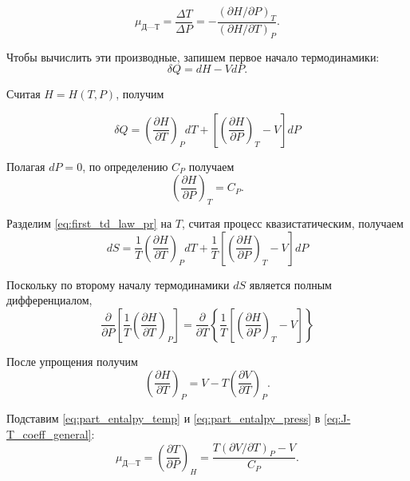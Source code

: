\documentclass[12pt]{article}
\begin{document}
	\begin{equation}
	\label{eq:J-T_coeff_general}
	\mu_\text{Д---Т}=\frac{\Delta T}{\Delta P}=-\frac{\left( \partial H/ \partial P\right)_T}{\left( \partial H/ \partial T\right)_P}.
	\end{equation}
	
	Чтобы вычислить эти производные, запишем первое начало термодинамики:
	\begin{equation}
	\label{eq:first_td_law}
	\delta Q = dH-VdP.
	\end{equation}
	
	Считая $H = H \left( T,P \right)$, получим
	
	\begin{equation}
	\label{eq:first_td_law_pr}
	\delta Q = \left( \frac{\partial H}{\partial T} \right)_P dT + \left[ \left( \frac{\partial H}{\partial P} \right)_T - V \right] dP
	\end{equation}
	
	Полагая $dP=0$, по определению $C_P$ получаем
	\begin{equation}
	\label{eq:part_entalpy_temp}
	\left( \frac{\partial H}{\partial P}\right)_T = C_P.
	\end{equation}
	
	Разделим \eqref{eq:first_td_law_pr} на $T$, считая процесс квазистатическим, получаем
	\begin{equation}
	\label{eq:enthropy_diff}
	dS = \frac{1}{T} \left( \frac{\partial H}{\partial T} \right)_P dT + \frac{1}{T} \left[ \left( \frac{\partial H}{\partial P} \right)_T - V \right] dP
	\end{equation}
	
	Поскольку по второму началу термодинамики $dS$ является полным дифференциалом,
	\begin{equation}
	\label{eq:enthropy_sec_partials}
	\frac{\partial}{\partial P} \left[ \frac{1}{T} \left( \frac{\partial H}{\partial T} \right)_P \right] = \frac{\partial}{\partial T} \left\{ \frac{1}{T} \left[ \left( \frac{\partial H}{\partial P} \right)_T - V \right] \right\}
	\end{equation}
	
	После упрощения получим
	\begin{equation}
	\label{eq:part_entalpy_press}
	\left( \frac{\partial H}{\partial T}\right)_P = V-T \left( \frac{\partial V}{\partial T}\right)_P.
	\end{equation}
	
	Подставим \eqref{eq:part_entalpy_temp} и \eqref{eq:part_entalpy_press} в \eqref{eq:J-T_coeff_general}:
	\begin{equation}
	\label{eq:J-T_coeff_general_final}
	\mu_\text{Д---Т}= \left( \frac{\partial T}{\partial P}\right)_H = \frac{ T\left( \partial V/ \partial T\right)_P -V}{C_P}.
	\end{equation}
	
\end{document}
